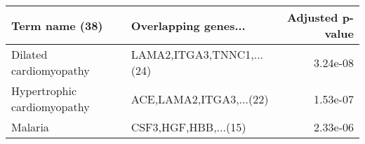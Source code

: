 \begin{tabular}{llr}
\toprule
             Term name (38) &      Overlapping genes... &  Adjusted p-value \\
\midrule
     Dilated cardiomyopathy & LAMA2,ITGA3,TNNC1,...(24) &          3.24e-08 \\
Hypertrophic cardiomyopathy &   ACE,LAMA2,ITGA3,...(22) &          1.53e-07 \\
                    Malaria &      CSF3,HGF,HBB,...(15) &          2.33e-06 \\
\bottomrule
\end{tabular}
